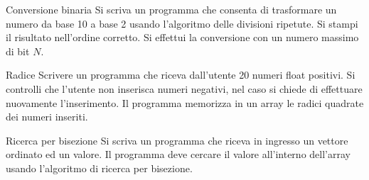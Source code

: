 \documentclass[format=169, handout]{beamer}
\begin{document}
\begin{frame}{Conversione binaria}
Si scriva un programma che consenta di trasformare un numero da base 10 a base 2 usando l'algoritmo delle divisioni ripetute. Si stampi il risultato nell'ordine corretto. Si effettui la conversione con un numero massimo di bit $N$.
\end{frame}

\begin{frame}{Radice}
Scrivere un programma che riceva dall'utente 20 numeri float positivi.
Si controlli che l'utente non inserisca numeri negativi, nel caso si chiede di effettuare nuovamente l'inserimento.
Il programma memorizza in un array le radici quadrate dei numeri inseriti.
\end{frame}

\begin{frame}{Ricerca per bisezione}
Si scriva un programma che riceva in ingresso un vettore ordinato ed un valore.
Il programma deve cercare il valore all'interno dell'array usando l'algoritmo di ricerca per bisezione.
\end{frame}
\end{document}
